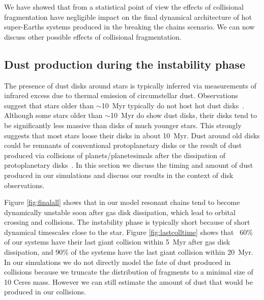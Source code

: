 \documentclass[fleqn,usenatbib]{mnras}
\begin{document}
We have showed that from a statistical point of view the effects of collisional fragmentation have negligible impact on the final dynamical architecture of hot super-Earths systems produced in the breaking the chains scenario. We can now discuss other possible effects of collisional fragmentation.


\subsection{Dust production during the instability phase}

The presence of dust disks around stars is typically inferred via  measurements of infrared excess due to thermal emission of circumstellar dust. Observations suggest that stars older than $\sim$10~Myr typically do not host hot dust disks~\citep{haisch01,wyatt08}. Although some stars older than $\sim$10~Myr do show dust disks, their disks tend to be significantly less massive than disks of much younger stars. This strongly suggests that most stars loose their disks in about 10~Myr. Dust around old disks could be remnants of conventional protoplanetary disks or the result of dust produced via collisions of planets/planetesimals after the dissipation of protoplanetary disks~\citep{wyatt08}. In this section we discuss the timing and amount of dust produced in our simulations and discuss our results in the context of disk observations.

Figure \ref{fig:finalall} shows that in our model resonant chains tend to become dynamically unstable soon after gas disk dissipation, which lead to orbital crossing and collisions. The instability phase is typically short because of short dynamical timescales close to the star. Figure \ref{fig:lastcolltime} shows that ~60\% of our systems have their last giant collision within 5~Myr after gas disk dissipation, and 90\% of the systems have the last giant collision within 20~Myr. In our simulations we do not directly model the fate of dust produced in collisions because we truncate the distribution of fragments to a minimal size of 10 Ceres mass. However we can still estimate  the amount of dust that would be produced in our collisions.
\end{document}
